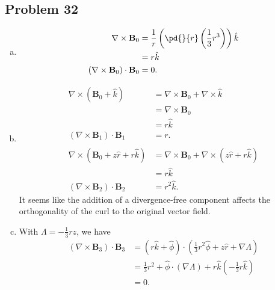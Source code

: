 \documentclass[10pt]{mypackage}
\begin{document}
\subsection{Problem 32}%
\begin{enumerate}[(a)]
  \item 
    \begin{align*}
      \nabla \times \mathbf{B}_0 &= \frac{1}{r}\left(\pd{}{r}\left(\frac{1}{3}r^3\right)\right)\hat{k}\\
                                 &= r\hat{k}\\
      \left(\nabla \times \mathbf{B}_0\right)\cdot \mathbf{B}_0 &= 0.
    \end{align*}
  \item 
    \begin{align*}
      \nabla \times \left(\mathbf{B}_0 + \hat{k}\right) &= \nabla \times \mathbf{B}_0 + \nabla \times \hat{k}\\
                                                        &= \nabla \times \mathbf{B}_0\\
                                                        &= r\hat{k}\\
      \left(\nabla \times \mathbf{B}_1\right)\cdot \mathbf{B}_1 &= r.\\
      \\
      \nabla \times \left(\mathbf{B}_0 + z\hat{r} + r\hat{k}\right) &= \nabla \times \mathbf{B}_0 + \nabla \times \left(z\hat{r} + r\hat{k}\right)\\
                                                                    &= r\hat{k}\\
      \left(\nabla \times \mathbf{B}_2\right)\cdot \mathbf{B}_2 &= r^2\hat{k}.
    \end{align*}
    It seems like the addition of a divergence-free component affects the orthogonality of the curl to the original vector field.
  \item With $\Lambda = -\frac{1}{3}rz$, we have
    \begin{align*}
      \left(\nabla \times \mathbf{B}_3\right)\cdot \mathbf{B}_3 &= \left(r\hat{k} + \hat{\phi}\right) \cdot \left(\frac{1}{3}r^2\hat{\phi} + z\hat{r} + \nabla\Lambda\right)\\
                                                                &= \frac{1}{3}r^2 + \hat{\phi}\cdot \left(\nabla\Lambda\right) + r\hat{k}\left(-\frac{1}{3}r\hat{k}\right)\\
                                                                &= 0.
    \end{align*}
\end{enumerate}
\end{document}
